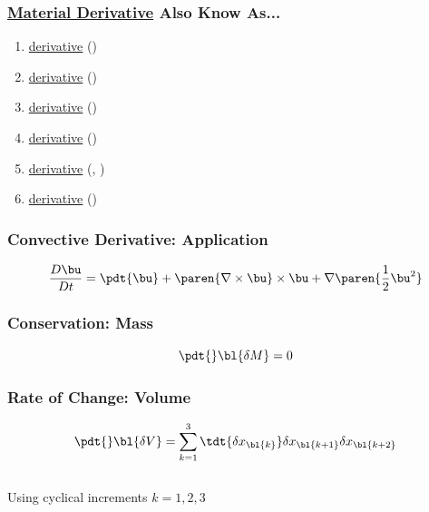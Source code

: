 %
\begin{frame}\frametitle{\href{https://en.wikipedia.org/wiki/Material_derivative}{Material Derivative} Also Know As...}
\begin{enumerate}
	\conti
	\item \href{}{ derivative} (\cite{stoker1992water})
	\item \href{}{ derivative} (\cite{bird2002transport})
	\item \href{}{ derivative} (\cite{granger1995fluid})
	\item \href{}{ derivative} (\cite{granger1995fluid})
	\item \href{}{ derivative} (\cite{bird2002transport}, \cite{landau1959fluid})
	\item \href{https://www.cambridge.org/core/books/gauge-field-theories/BFDECE4B2C0FE428C540232E36D39288}{ derivative} (\cite{pokorski2000gauge})
\end{enumerate}
\end{frame}
%
\begin{frame}\frametitle{Convective Derivative: Application}
\href{https://mathworld.wolfram.com/ConvectiveDerivative.html}{
\begin{equation}
	\frac{D\bu}{Dt} = \pdt{\bu} + \paren{ \nabla \times \bu} \times \bu + \nabla \paren{ \frac{1}{2}\bu^{2} }	
\label{eq:convective-definition-u}
\end{equation}}
\end{frame}
%
%
\begin{frame}\frametitle{Conservation: Mass}
\begin{equation}
	\pdt{}\bl{\delta M} = 0%
\label{eq:conservation-mass}
\end{equation}
\end{frame}
%
\begin{frame}\frametitle{Rate of Change: Volume}
\begin{equation}
	\pdt{}\bl{\delta V} = \sum_{k=1}^{3} \tdt{\delta x_{\bl{k}}} \delta x_{\bl{k+1}} \delta x_{\bl{k+2}}%
\label{eq:conservation-mass}
\end{equation}
\ \\[20pt]
\center
Using cyclical increments $k=1,2,3$
\end{frame}
%


\endinput  %
